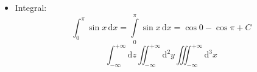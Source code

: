 \documentclass { article }
\begin{document}
\begin{itemize}
  \item Integral:
        \[
            \int_0^\pi        \sin x \, \mathrm{d} x
          = \int\limits_0^\pi \sin x \, \mathrm{d} x
          = \cos 0 - \cos\pi + C
        \]
        \[
          \int_{-\infty}^{+\infty}    \mathrm{d} z
          \iint_{-\infty}^{+\infty}   \mathrm{d}^2 y
          \iiint_{-\infty}^{+\infty}  \mathrm{d}^3 x
\]
\end{itemize}
\end{document}
